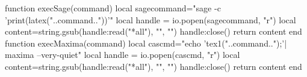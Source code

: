 \documentclass[a4paper]{article}
\begin{document}
% 
\begin{luacode*}
function execSage(command)
  local sagecommand="sage -c 'print(latex("..command.."))'"
  local handle = io.popen(sagecommand, "r")
  local content=string.gsub(handle:read("*all"), "\n", "")
  handle:close()
  return content
end
function execMaxima(command)
  local cascmd="echo 'tex1("..command..");'| maxima --very-quiet"
  local handle = io.popen(cascmd, "r")
  local content=string.gsub(handle:read("*all"), "\n", "")
  handle:close()
  return content
end
\end{luacode*}

\end{document}

